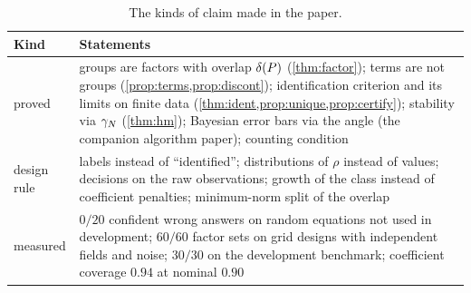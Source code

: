 \begin{table}[tbp]
\centering\small
\caption{The kinds of claim made in the paper.}\label{tab:status}
\begin{tabularx}{\linewidth}{@{}>{\raggedright\arraybackslash}p{2.2cm}X@{}}
\toprule
Kind & Statements\\
\midrule
proved & groups are factors with overlap $\delta(P)$ (\cref{thm:factor}); terms are not groups (\cref{prop:terms,prop:discont});
identification criterion and its limits on finite data (\cref{thm:ident,prop:unique,prop:certify}); stability via
$\gamma_{N}$ (\cref{thm:hm}); Bayesian error bars via the angle (the companion algorithm paper); counting condition\\
design rule & labels instead of ``identified''; distributions of $\rho$ instead of values; decisions on the raw observations;
growth of the class instead of coefficient penalties; minimum-norm split of the overlap\\
measured & $0/20$ confident wrong answers on random equations not used in development; $60/60$ factor sets on grid
designs with independent fields and noise; $30/30$ on the development benchmark; coefficient coverage $0.94$ at
nominal $0.90$\\
\bottomrule
\end{tabularx}
\end{table}
